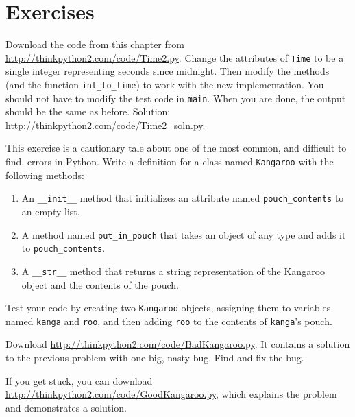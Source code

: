 \section{Exercises}

\begin{exercise}

Download the code from this chapter from
\url{http://thinkpython2.com/code/Time2.py}.  Change the attributes of
    {\tt Time} to be a single integer representing seconds since
    midnight.  Then modify the methods (and the function
    \verb"int_to_time") to work with the new implementation.  You
    should not have to modify the test code in {\tt main}.  When you
    are done, the output should be the same as before.  Solution:
    \url{http://thinkpython2.com/code/Time2_soln.py}.

\end{exercise}


\begin{exercise}
\label{kangaroo}

This exercise is a cautionary tale about one of the most
common, and difficult to find, errors in Python.
Write a definition for a class named {\tt Kangaroo} with the following
methods:

\begin{enumerate}

\item An \verb"__init__" method that initializes an attribute named
\verb"pouch_contents" to an empty list.

\item A method named \verb"put_in_pouch" that takes an object
of any type and adds it to \verb"pouch_contents".

\item A \verb"__str__" method that returns a string representation
of the Kangaroo object and the contents of the pouch.

\end{enumerate}
%
Test your code
by creating two {\tt Kangaroo} objects, assigning them to variables
named {\tt kanga} and {\tt roo}, and then adding {\tt roo} to the
contents of {\tt kanga}'s pouch.

Download \url{http://thinkpython2.com/code/BadKangaroo.py}.  It contains
a solution to the previous problem with one big, nasty bug.
Find and fix the bug.

If you get stuck, you can download
\url{http://thinkpython2.com/code/GoodKangaroo.py}, which explains the
problem and demonstrates a solution.
    

\end{exercise}

